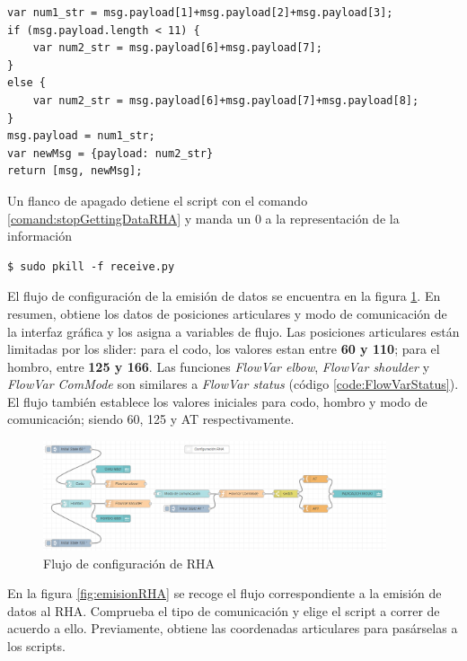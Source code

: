 \begin{lstlisting}[frame=leftline, caption={Data Interpreter}, label=code:DataInterpreter]
var num1_str = msg.payload[1]+msg.payload[2]+msg.payload[3];
if (msg.payload.length < 11) {
    var num2_str = msg.payload[6]+msg.payload[7];
}
else {
    var num2_str = msg.payload[6]+msg.payload[7]+msg.payload[8];
}
msg.payload = num1_str;
var newMsg = {payload: num2_str}
return [msg, newMsg];
\end{lstlisting}

Un flanco de apagado detiene el script con el comando \ref{comand:stopGettingDataRHA} y manda un 0 a la representación de la información


\begin{lstlisting}[frame=single, label=command:stopGettingDataRHA]
$ sudo pkill -f receive.py
\end{lstlisting}

El flujo de configuración de la emisión de datos se encuentra en la figura \ref{fig:configRHA}. En resumen, obtiene los datos de posiciones articulares y modo de comunicación de la interfaz gráfica y los asigna a variables de flujo. Las posiciones articulares están limitadas por los slider: para el codo, los valores estan entre \textbf{60 y 110}; para el hombro, entre \textbf{125 y 166}. Las funciones \textit{FlowVar elbow}, \textit{FlowVar shoulder} y \textit{FlowVar ComMode} son similares a \textit{FlowVar status} (código \ref{code:FlowVarStatus}). El flujo también establece los valores iniciales para codo, hombro y modo de comunicación; siendo 60, 125 y AT respectivamente.

\begin{figure}[H]
\centering
\includegraphics[width=0.9\textwidth]{figuras/configFlowRHA.png}
\caption{Flujo de configuración de RHA}
\label{fig:configRHA}
\end{figure}

En la figura \ref{fig:emisionRHA} se recoge el flujo correspondiente a la emisión de datos al RHA. Comprueba el tipo de comunicación y elige el script a correr de acuerdo a ello. Previamente, obtiene las coordenadas articulares para pasárselas a los scripts.

